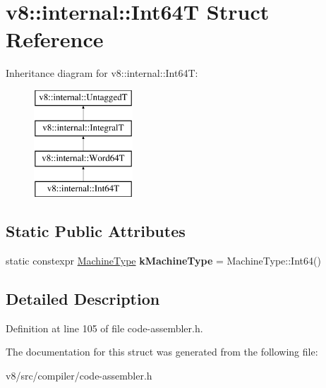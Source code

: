 \hypertarget{structv8_1_1internal_1_1Int64T}{}\section{v8\+:\+:internal\+:\+:Int64T Struct Reference}
\label{structv8_1_1internal_1_1Int64T}
Inheritance diagram for v8\+:\+:internal\+:\+:Int64T\+:\begin{figure}[H]
\begin{center}
\leavevmode
\includegraphics[height=4.000000cm]{structv8_1_1internal_1_1Int64T}
\end{center}
\end{figure}
\subsection*{Static Public Attributes}
\begin{DoxyCompactItemize}
\item 
\mbox{\label{structv8_1_1internal_1_1Int64T_ac8c8028d72975c0f5e2657e98ba0daa4}} 
static constexpr \mbox{\hyperlink{classv8_1_1internal_1_1MachineType}{Machine\+Type}} {\bfseries k\+Machine\+Type} = Machine\+Type\+::\+Int64()
\end{DoxyCompactItemize}


\subsection{Detailed Description}


Definition at line 105 of file code-\/assembler.\+h.



The documentation for this struct was generated from the following file\+:\begin{DoxyCompactItemize}
\item 
v8/src/compiler/code-\/assembler.\+h\end{DoxyCompactItemize}
